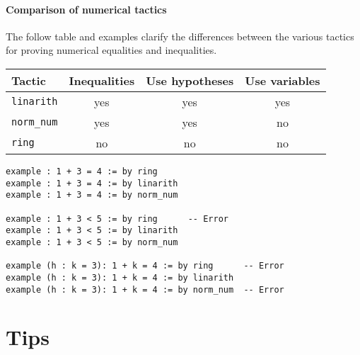 \paragraph{Comparison of numerical tactics} The follow table and examples clarify the differences between the various tactics for proving numerical equalities and inequalities.
\begin{center}
\begin{tabular}{l|c|c|c}
\hline
Tactic & Inequalities & Use hypotheses & Use variables\\\hline
\Verb+linarith+ &yes& yes & yes\\
\Verb+norm_num+ & yes &yes & no\\
\Verb+ring+ & no & no & no \\
\end{tabular}
\end{center}

\bigskip

\begin{Verbatim}[numbers=none]
example : 1 + 3 = 4 := by ring
example : 1 + 3 = 4 := by linarith
example : 1 + 3 = 4 := by norm_num

example : 1 + 3 < 5 := by ring      -- Error
example : 1 + 3 < 5 := by linarith
example : 1 + 3 < 5 := by norm_num

example (h : k = 3): 1 + k = 4 := by ring      -- Error
example (h : k = 3): 1 + k = 4 := by linarith
example (h : k = 3): 1 + k = 4 := by norm_num  -- Error
\end{Verbatim}

\newpage

\section{Tips}

